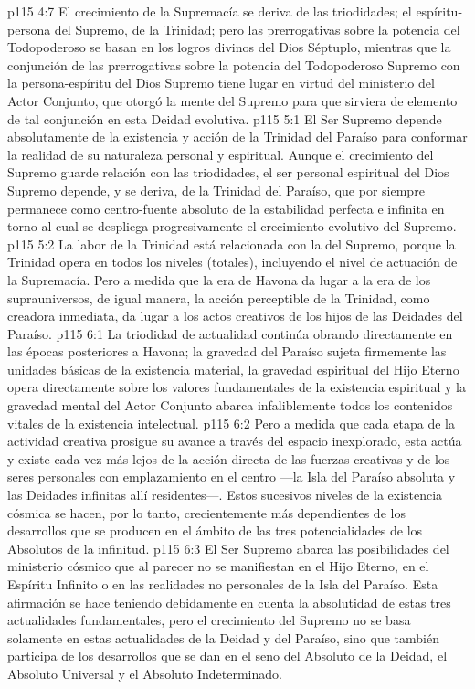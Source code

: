 \vs p115 4:7 El crecimiento de la Supremacía se deriva de las triodidades; el espíritu\hyp{}persona del Supremo, de la Trinidad; pero las prerrogativas sobre la potencia del Todopoderoso se basan en los logros divinos del Dios Séptuplo, mientras que la conjunción de las prerrogativas sobre la potencia del Todopoderoso Supremo con la persona\hyp{}espíritu del Dios Supremo tiene lugar en virtud del ministerio del Actor Conjunto, que otorgó la mente del Supremo para que sirviera de elemento de tal conjunción en esta Deidad evolutiva.
\vs p115 5:1 El Ser Supremo depende absolutamente de la existencia y acción de la Trinidad del Paraíso para conformar la realidad de su naturaleza personal y espiritual. Aunque el crecimiento del Supremo guarde relación con las triodidades, el ser personal espiritual del Dios Supremo depende, y se deriva, de la Trinidad del Paraíso, que por siempre permanece como centro\hyp{}fuente absoluto de la estabilidad perfecta e infinita en torno al cual se despliega progresivamente el crecimiento evolutivo del Supremo.
\vs p115 5:2 La labor de la Trinidad está relacionada con la del Supremo, porque la Trinidad opera en todos los niveles (totales), incluyendo el nivel de actuación de la Supremacía. Pero a medida que la era de Havona da lugar a la era de los suprauniversos, de igual manera, la acción perceptible de la Trinidad, como creadora inmediata, da lugar a los actos creativos de los hijos de las Deidades del Paraíso.
\vs p115 6:1 La triodidad de actualidad continúa obrando directamente en las épocas posteriores a Havona; la gravedad del Paraíso sujeta firmemente las unidades básicas de la existencia material, la gravedad espiritual del Hijo Eterno opera directamente sobre los valores fundamentales de la existencia espiritual y la gravedad mental del Actor Conjunto abarca infaliblemente todos los contenidos vitales de la existencia intelectual.
\vs p115 6:2 Pero a medida que cada etapa de la actividad creativa prosigue su avance a través del espacio inexplorado, esta actúa y existe cada vez más lejos de la acción directa de las fuerzas creativas y de los seres personales con emplazamiento en el centro ---la Isla del Paraíso absoluta y las Deidades infinitas allí residentes---. Estos sucesivos niveles de la existencia cósmica se hacen, por lo tanto, crecientemente más dependientes de los desarrollos que se producen en el ámbito de las tres potencialidades de los Absolutos de la infinitud.
\vs p115 6:3 El Ser Supremo abarca las posibilidades del ministerio cósmico que al parecer no se manifiestan en el Hijo Eterno, en el Espíritu Infinito o en las realidades no personales de la Isla del Paraíso. Esta afirmación se hace teniendo debidamente en cuenta la absolutidad de estas tres actualidades fundamentales, pero el crecimiento del Supremo no se basa solamente en estas actualidades de la Deidad y del Paraíso, sino que también participa de los desarrollos que se dan en el seno del Absoluto de la Deidad, el Absoluto Universal y el Absoluto Indeterminado.
